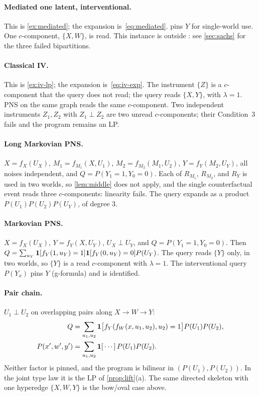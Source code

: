 \paragraph{Mediated one latent, interventional.}
This is \cref{ex:mediated}; the expansion is~\eqref{eq:mediated}.
 pins $Y$ for single-world use. One $c$-component,
$\{X,W\}$, is read. This instance is outside
\citet[Proposition~2]{symbolicbounds2023general}: see \cref{sec:sachs}
for the three failed bipartitions.

\paragraph{Classical IV.}
This is \cref{ex:iv-lp}; the expansion is~\eqref{eq:iv-exp}. The instrument
$\{Z\}$ is a $c$-component that the query does not read; the query reads
$\{X,Y\}$, with $\lambda=1$. PNS on the same graph reads the same
$c$-component. Two independent instruments $Z_1,Z_2$ with $Z_1\perp Z_2$ are
two unread $c$-components; their Condition~3 fails and the program remains an
LP.

\paragraph{Long Markovian PNS.}
$X=f_X(U_X)$, $M_1=f_{M_1}(X,U_1)$, $M_2=f_{M_2}(M_1,U_2)$,
$Y=f_Y(M_2,U_Y)$, all noises independent, and
$Q=P(Y_1{=}1,Y_0{=}0)$. Each of $R_{M_1}$, $R_{M_2}$, and $R_Y$ is used in two
worlds, so \cref{lem:middle} does not apply, and the single counterfactual event reads three
$c$-components: linearity fails. The query expands as a product
$P(U_1)P(U_2)P(U_Y)$, of degree $3$.

\paragraph{Markovian PNS.}
$X=f_X(U_X)$, $Y=f_Y(X,U_Y)$, $U_X\perp U_Y$, and
$Q=P(Y_1{=}1,Y_0{=}0)$. Then
$Q=\sum_{u_Y}\mathbf{1}[f_Y(1,u_Y)=1]\mathbf{1}[f_Y(0,u_Y)=0]P(U_Y)$.
The query reads $\{Y\}$ only, in two worlds, so $\{Y\}$ is a read
$c$-component with $\lambda=1$. The interventional query $P(Y_x)$ pins
$Y$ (g-formula) and is identified.

\paragraph{Pair chain.}
$U_1\perp U_2$ on overlapping pairs along $X\to W\to Y$:
\begin{align*}
Q
&=
\sum_{u_1,u_2}
\mathbf{1}\bigl[f_Y(f_W(x,u_1,u_2),u_2)=1\bigr]
P(U_1)P(U_2),
\\
P(x',w',y')
&=
\sum_{u_1,u_2}\mathbf{1}[\,\cdots\,]\,P(U_1)P(U_2).
\end{align*}
Neither factor is pinned, and the program is bilinear in $(P(U_1),P(U_2))$.
In the joint type law it is the LP of \cref{prop:lift}(a). The same directed
skeleton with one hyperedge $\{X,W,Y\}$ is the bow/oval case above.

